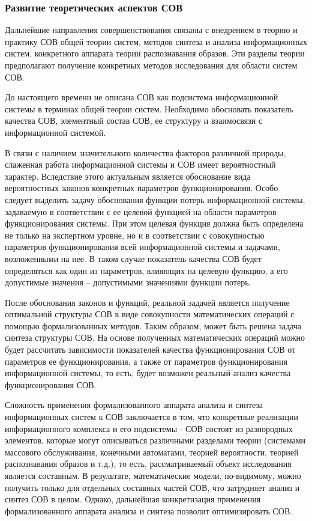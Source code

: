\subsubsection{Развитие теоретических аспектов СОВ}

Дальнейшие направления совершенствования связаны с внедрением в теорию и практику СОВ
общей теории систем, методов синтеза и анализа информационных систем, конкретного аппарата
теории распознавания образов. Эти разделы теории предполагают получение конкретных методов
исследования для области систем СОВ.

До настоящего времени не описана СОВ как подсистема информационной системы в терминах
общей теории систем. Необходимо обосновать показатель качества СОВ, элементный состав
СОВ, ее структуру и взаимосвязи с информационной системой.

В связи с наличием значительного количества факторов различной природы, слаженная работа
информационной системы и СОВ имеет вероятностный характер. Вследствие этого актуальным
является обоснование вида вероятностных законов конкретных параметров функционирования.
Особо следует выделить задачу обоснования функции потерь информационной системы, задаваемую
в соответствии с ее целевой функцией на области параметров функционирования системы.
При этом целевая функция должна быть определена не только на экспертном уровне, но и в
соответствии с совокупностью параметров функционирования всей информационной системы и
задачами, возложенными на нее. В таком случае показатель качества СОВ будет определяться
как один из параметров, влияющих на целевую функцию, а его допустимые значения --
допустимыми значениями функции потерь.

После обоснования законов и функций, реальной задачей является получение оптимальной
структуры СОВ в виде совокупности математических операций с помощью формализованных
методов. Таким образом, может быть решена задача синтеза структуры СОВ. На основе
полученных математических операций можно будет рассчитать зависимости показателей
качества функционирования СОВ от параметров ее функционирования, а также от параметров
функционирования информационной системы, то есть, будет возможен реальный анализ качества
функционирования СОВ.

Сложность применения формализованного аппарата анализа и синтеза информационных систем
к СОВ заключается в том, что конкретные реализации информационного комплекса и его
подсистемы - СОВ состоят из разнородных элементов, которые могут описываться различными
разделами теории (системами массового обслуживания, конечными автоматами, теорией
вероятности, теорией распознавания образов и т.д.), то есть, рассматриваемый объект
исследования является составным. В результате, математические модели, по-видимому,
можно получить только для отдельных составных частей СОВ, что затрудняет анализ и
синтез СОВ в целом. Однако, дальнейшая конкретизация применения формализованного
аппарата анализа и синтеза позволит оптимизировать СОВ.

